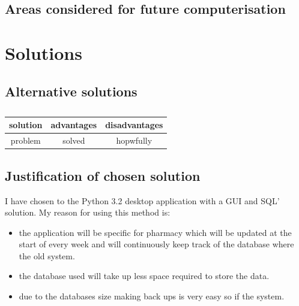 \subsection{Areas considered for future computerisation}

\section{Solutions}
\subsection{Alternative solutions} 
\begin{table}
\begin{tabular}{|c|c|c|}
\hline
solution & advantages & disadvantages\\
\hline
problem & solved & hopwfully\\
\hline
\end{tabular}
\caption{}
\label{tab:nonlin}
\end{table}
\subsection{Justification of chosen solution}
I have chosen to the Python 3.2 desktop application with a GUI and SQL' solution. My reason for using this method is:
\begin{itemize}
    \item the application will be specific for pharmacy which will be updated at the start of every week and will continuously keep track of the database where the old system.
    \item the database used will take up less space required to store the data.
    \item due to the databases size making back ups is very easy so if the system.
\end{itemize} 

